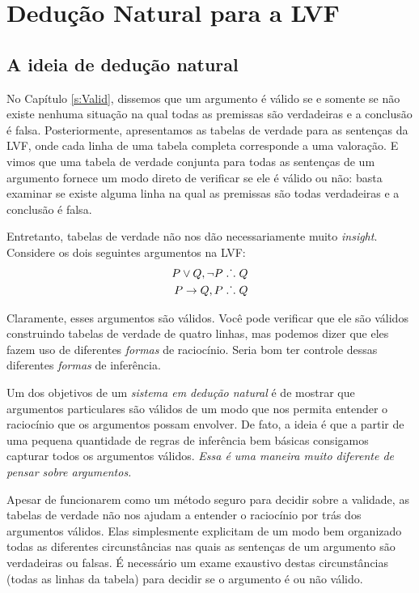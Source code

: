 \part{Dedução Natural para a LVF}
\label{ch.NDTFL}

 
\chapter{A ideia de dedução natural}\label{s:NDVeryIdea}

No  Capítulo  \ref{s:Valid}, dissemos que um argumento é válido se e somente se não existe nenhuma situação na qual todas as premissas são verdadeiras e a conclusão é falsa. Posteriormente,  apresentamos as tabelas de verdade para as sentenças da LVF, onde  cada linha de uma tabela completa corresponde a uma valoração. E vimos que uma tabela de verdade conjunta para todas as sentenças de um argumento fornece um modo direto de verificar se ele é válido ou não: basta examinar se existe alguma linha na qual as premissas são todas verdadeiras e a conclusão é falsa.

Entretanto, tabelas de verdade não nos dão necessariamente muito  \emph{insight}. Considere os dois seguintes argumentos na LVF:
\begin{align*}
P \vee Q, \neg P & \mathrel{\ldotp\dot{}\,\ldotp} Q\\
P \rightarrow Q, P & \mathrel{\ldotp\dot{}\,\ldotp} Q
\end{align*}

Claramente, esses argumentos são válidos. Você  pode verificar que ele são válidos construindo tabelas de verdade de quatro linhas, mas podemos dizer que eles fazem uso de diferentes \emph{formas}  de raciocínio. Seria bom ter controle dessas diferentes \emph{formas}  de inferência.

Um dos objetivos de um \emph{sistema em dedução natural} é de mostrar que argumentos particulares são  válidos de um modo que nos permita entender o raciocínio que os argumentos possam envolver.  De fato, a ideia é que a partir de uma pequena quantidade de regras de inferência bem básicas consigamos capturar todos os argumentos válidos.
\emph{Essa é uma maneira muito diferente de pensar sobre argumentos.} 

Apesar de funcionarem como um método seguro para decidir sobre a validade, as tabelas de verdade não nos ajudam a entender o raciocínio por trás dos argumentos válidos. Elas simplesmente explicitam de um modo bem organizado todas as diferentes circunstâncias nas quais as sentenças de um argumento são verdadeiras ou falsas. É necessário um exame exaustivo destas circunstâncias (todas as linhas da tabela) para decidir se o argumento é ou não válido.

